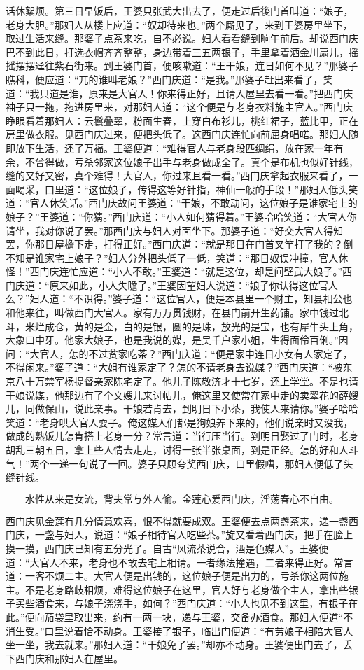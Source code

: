 话休絮烦。第三日早饭后，王婆只张武大出去了，便走过后後门首叫道：“娘子，老身大胆。”那妇人从楼上应道：“奴却待来也。”两个厮见了，来到王婆房里坐下，取过生活来缝。那婆子点茶来吃，自不必说。妇人看看缝到晌午前后。却说西门庆巴不到此日，打选衣帽齐齐整整，身边带着三五两银子，手里拿着洒金川扇儿，摇摇摆摆迳往紫石街来。到王婆门首，便咳嗽道：“王干娘，连日如何不见？”那婆子瞧科，便应道：“兀的谁叫老娘？”西门庆道：“是我。”那婆子赶出来看了，笑道：“我只道是谁，原来是大官人！你来得正好，且请入屋里去看一看。”把西门庆袖子只一拖，拖进房里来，对那妇人道：“这个便是与老身衣料施主官人。”西门庆睁眼看着那妇人：云鬟叠翠，粉面生春，上穿白布衫儿，桃红裙子，蓝比甲，正在房里做衣服。见西门庆过来，便把头低了。这西门庆连忙向前屈身唱喏。那妇人随即放下生活，还了万福。王婆便道：“难得官人与老身段匹绸绢，放在家一年有余，不曾得做，亏杀邻家这位娘子出手与老身做成全了。真个是布机也似好针线，缝的又好又密，真个难得！大官人，你过来且看一看。”西门庆拿起衣服来看了，一面喝采，口里道：“这位娘子，传得这等好针指，神仙一般的手段！”那妇人低头笑道：“官人休笑话。”西门庆故问王婆道：“干娘，不敢动问，这位娘子是谁家宅上的娘子？”王婆道：“你猜。”西门庆道：“小人如何猜得着。”王婆哈哈笑道：“大官人你请坐，我对你说了罢。”那西门庆与妇人对面坐下。那婆子道：“好交大官人得知罢，你那日屋檐下走，打得正好。”西门庆道：“就是那日在门首叉竿打了我的？倒不知是谁家宅上娘子？”妇人分外把头低了一低，笑道：“那日奴误冲撞，官人休怪！”西门庆连忙应道：“小人不敢。”王婆道：“就是这位，却是间壁武大娘子。”西门庆道：“原来如此，小人失瞻了。”王婆因望妇人说道：“娘子你认得这位官人么？”妇人道：“不识得。”婆子道：“这位官人，便是本县里一个财主，知县相公也和他来往，叫做西门大官人。家有万万贯钱财，在县门前开生药铺。家中钱过北斗，米烂成仓，黄的是金，白的是银，圆的是珠，放光的是宝，也有犀牛头上角，大象口中牙。他家大娘子，也是我说的媒，是吴千户家小姐，生得面伶百俐。”因问：“大官人，怎的不过贫家吃茶？”西门庆道：“便是家中连日小女有人家定了，不得闲来。”婆子道：“大姐有谁家定了？怎的不请老身去说媒？”西门庆道：“被东京八十万禁军杨提督亲家陈宅定了。他儿子陈敬济才十七岁，还上学堂。不是也请干娘说媒，他那边有了个文嫂儿来讨帖儿，俺这里又使常在家中走的卖翠花的薛嫂儿，同做保山，说此亲事。干娘若肯去，到明日下小茶，我使人来请你。”婆子哈哈笑道：“老身哄大官人耍子。俺这媒人们都是狗娘养下来的，他们说亲时又没我，做成的熟饭儿怎肯搭上老身一分？常言道：当行压当行。到明日娶过了门时，老身胡乱三朝五日，拿上些人情去走走，讨得一张半张桌面，到是正经。怎的好和人斗气！”两个一递一句说了一回。婆子只顾夸奖西门庆，口里假嘈，那妇人便低了头缝针线。

\[
水性从来是女流，背夫常与外人偷。
金莲心爱西门庆，淫荡春心不自由。
\]

西门庆见金莲有几分情意欢喜，恨不得就要成双。王婆便去点两盏茶来，递一盏西门庆，一盏与妇人，说道：“娘子相待官人吃些茶。”旋又看着西门庆，把手在脸上摸一摸，西门庆已知有五分光了。自古“风流茶说合，酒是色媒人”。王婆便道：“大官人不来，老身也不敢去宅上相请。一者缘法撞遇，二者来得正好。常言道：一客不烦二主。大官人便是出钱的，这位娘子便是出力的，亏杀你这两位施主。不是老身路歧相烦，难得这位娘子在这里，官人好与老身做个主人，拿出些银子买些酒食来，与娘子浇浇手，如何？”西门庆道：“小人也见不到这里，有银子在此。”便向茄袋里取出来，约有一两一块，递与王婆，交备办酒食。那妇人便道“不消生受。”口里说着恰不动身。王婆接了银子，临出门便道：“有劳娘子相陪大官人坐一坐，我去就来。”那妇人道：“干娘免了罢。”却亦不动身。王婆便出门去了，丢下西门庆和那妇人在屋里。

